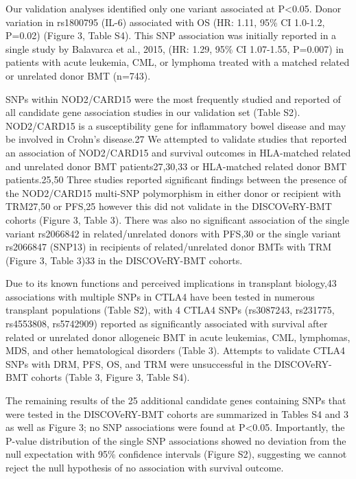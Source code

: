 \documentclass[]{DissertateUSU}
\begin{document}
Our validation analyses identified only one variant associated at
P\textless{}0.05. Donor variation in rs1800795 (IL-6) associated with OS
(HR: 1.11, 95\% CI 1.0-1.2, P=0.02) (Figure 3, Table S4). This SNP
association was initially reported in a single study by Balavarca et
al., 2015, (HR: 1.29, 95\% CI 1.07-1.55, P=0.007) in patients with acute
leukemia, CML, or lymphoma treated with a matched related or unrelated
donor BMT (n=743).

SNPs within NOD2/CARD15 were the most frequently studied and reported of
all candidate gene association studies in our validation set (Table S2).
NOD2/CARD15 is a susceptibility gene for inflammatory bowel disease and
may be involved in Crohn's disease.27 We attempted to validate studies
that reported an association of NOD2/CARD15 and survival outcomes in
HLA-matched related and unrelated donor BMT patients27,30,33 or
HLA-matched related donor BMT patients.25,50 Three studies reported
significant findings between the presence of the NOD2/CARD15 multi-SNP
polymorphism in either donor or recipient with TRM27,50 or PFS,25
however this did not validate in the DISCOVeRY-BMT cohorts (Figure 3,
Table 3). There was also no significant association of the single
variant rs2066842 in related/unrelated donors with PFS,30 or the single
variant rs2066847 (SNP13) in recipients of related/unrelated donor BMTs
with TRM (Figure 3, Table 3)33 in the DISCOVeRY-BMT cohorts.

Due to its known functions and perceived implications in transplant
biology,43 associations with multiple SNPs in CTLA4 have been tested in
numerous transplant populations (Table S2), with 4 CTLA4 SNPs
(rs3087243, rs231775, rs4553808, rs5742909) reported as significantly
associated with survival after related or unrelated donor allogeneic BMT
in acute leukemias, CML, lymphomas, MDS, and other hematological
disorders (Table 3). Attempts to validate CTLA4 SNPs with DRM, PFS, OS,
and TRM were unsuccessful in the DISCOVeRY-BMT cohorts (Table 3, Figure
3, Table S4).

The remaining results of the 25 additional candidate genes containing
SNPs that were tested in the DISCOVeRY-BMT cohorts are summarized in
Tables S4 and 3 as well as Figure 3; no SNP associations were found at
P\textless{}0.05. Importantly, the P-value distribution of the single
SNP associations showed no deviation from the null expectation with 95\%
confidence intervals (Figure S2), suggesting we cannot reject the null
hypothesis of no association with survival outcome.
\end{document}
